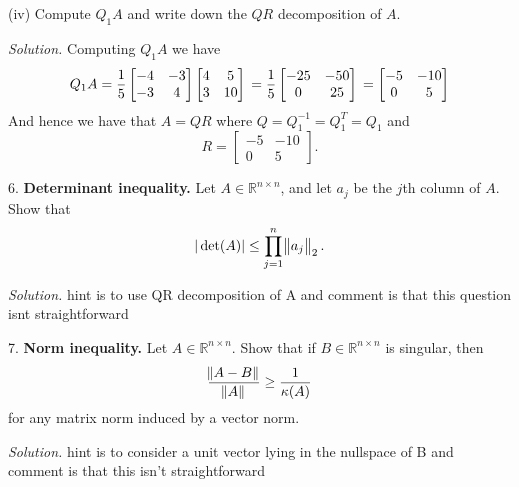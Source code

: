 \documentclass{article}
\newcommand{\R}{\mathbb{R}}
\begin{document}
\vspace{5mm}

(iv) Compute $Q_1 A$ and write down the $QR$ decomposition of $A$.

\textit{Solution.}
Computing $Q_1 A$ we have
%
\begin{equation*}
    Q_1 A =
        \frac{1}{5}
        \begin{bmatrix}
            -4 & -3 \\
            -3 & 4
        \end{bmatrix}
       \begin{bmatrix}
           4 & 5 \\
           3 & 10
       \end{bmatrix}
       \\ =
        \frac{1}{5}
        \begin{bmatrix}
            -25 & -50 \\
            0 & 25
        \end{bmatrix}
       \\ =
        \begin{bmatrix}
            -5 & -10 \\
            0 & 5
        \end{bmatrix}
\end{equation*}
%
And hence we have that $A = QR$ where $Q = Q_1^{-1} = Q_1^T = Q_1$
and
%
\begin{equation*}
    R =
    \begin{bmatrix}
        -5 & -10 \\
        0 & 5
    \end{bmatrix}
    .
\end{equation*}

\newpage

6. \textbf{Determinant inequality.}
Let $A \in \R^{n \times n}$, and let $a_j$ be the $j$th column of $A$.
Show that
%
\begin{equation*}
    |\det(A)| \leq \prod_{j = 1}^n \enVert{a_j}_2
    .
\end{equation*}

\textit{Solution.}
hint is to use QR decomposition of A and comment is that this question isnt
straightforward

\newpage

7. \textbf{Norm inequality.}
Let $A \in \R^{n \times n}$. Show that if $B \in \R^{n \times n}$ is
singular, then
%
\begin{equation*}
    \frac{\enVert{A - B}}{\enVert{A}} \geq \frac{1}{\kappa(A)}
\end{equation*}
%
for any matrix norm induced by a vector norm.

\textit{Solution.}
hint is to consider a unit vector lying in the nullspace of B and comment
is that this isn't straightforward
\end{document}
